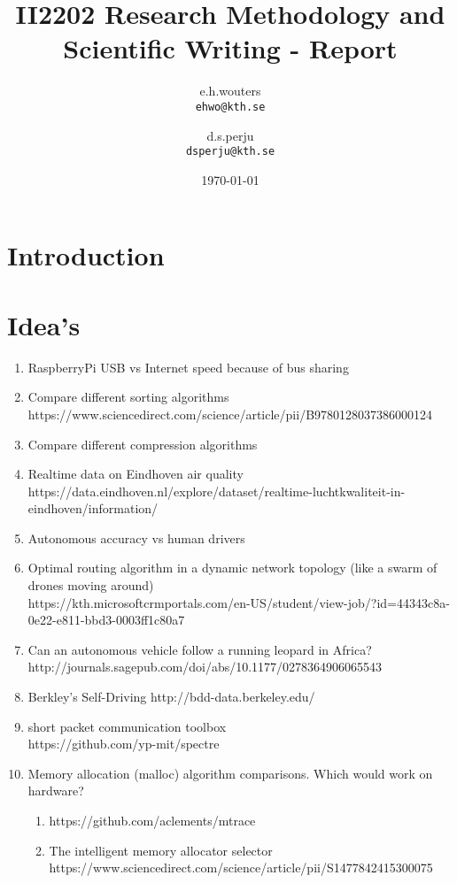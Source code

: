 \documentclass{article}
\title{II2202 Research Methodology and Scientific Writing - Report}
\author{
  e.h.wouters\\
  \texttt{ehwo@kth.se}
  \and
  d.s.perju\\
  \texttt{dsperju@kth.se}
}
\date{\today}
\begin{document}
\maketitle

\section{Introduction}

\section{Idea's}
\begin{enumerate}
    \item RaspberryPi USB vs Internet speed because of bus sharing
    \item Compare different sorting algorithms \\
    https://www.sciencedirect.com/science/article/pii/B9780128037386000124
    \item Compare different compression algorithms
    \item Realtime data on Eindhoven air quality \\ https://data.eindhoven.nl/explore/dataset/realtime-luchtkwaliteit-in-eindhoven/information/
    \item Autonomous accuracy vs human drivers
    \item Optimal routing algorithm in a dynamic network topology (like a swarm of drones moving around) \\
    https://kth.microsoftcrmportals.com/en-US/student/view-job/?id=44343c8a-0e22-e811-bbd3-0003ff1c80a7
    \item Can an autonomous vehicle follow a running leopard in Africa? \\
    http://journals.sagepub.com/doi/abs/10.1177/0278364906065543
    \item Berkley's Self-Driving http://bdd-data.berkeley.edu/
    \item short packet communication toolbox \\
    https://github.com/yp-mit/spectre
    \item Memory allocation (malloc) algorithm comparisons. Which would work on hardware?
    \begin{enumerate}
        \item https://github.com/aclements/mtrace
        \item The intelligent memory allocator selector \\
        https://www.sciencedirect.com/science/article/pii/S1477842415300075

\end{enumerate}
\end{enumerate}
\end{document}
